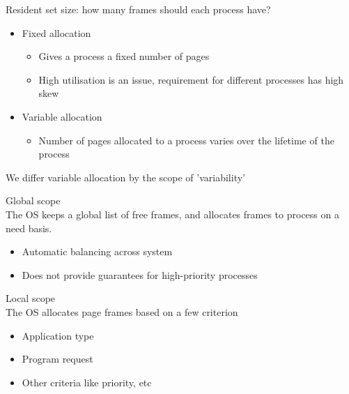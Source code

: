 \documentclass[journal, letterpaper]{IEEEtran}
\begin{document}
\begin{aside}{Resident set size: how many frames should each process have?}
    \begin{itemize}
        \item Fixed allocation
        \begin{itemize}
            \item Gives a process a fixed number of pages
            \item High utilisation is an issue, requirement for different processes has high skew
        \end{itemize}
        \item Variable allocation
        \begin{itemize}
            \item Number of pages allocated to a process varies over the lifetime of the process
        \end{itemize}
    \end{itemize}
    We differ variable allocation by the scope of 'variability'
    \begin{example}{Global scope} \\
        The OS keeps a global list of free frames, and allocates frames to process on a need basis.
        \begin{itemize}
            \item[\ding{51}] Automatic balancing across system
            \item[\ding{55}] Does not provide guarantees for high-priority processes
        \end{itemize}
    \end{example}
    \begin{example}{Local scope} \\
        The OS allocates page frames based on a few criterion
        \begin{itemize}
            \item Application type
            \item Program request
            \item Other criteria like priority, etc
        \end{itemize}
    \end{example}
\end{aside}
\end{document}

